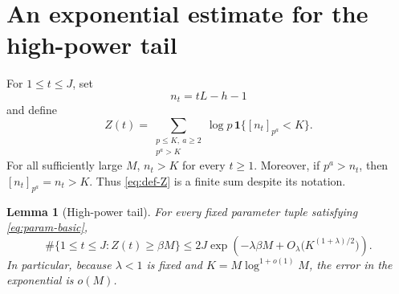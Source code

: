 \documentclass[11pt]{article}
\newtheorem{lemma}[theorem]{Lemma}
\theoremstyle{remark}
\newcommand{\ind}{\mathbf 1}
\begin{document}
\section{An exponential estimate for the high-power tail}\label{sec:tail}

For \(1\leq t\leq J\), set
\begin{equation}\label{eq:def-nt}
 n_t=tL-h-1
\end{equation}
and define
\begin{equation}\label{eq:def-Z}
 Z(t)=
 \sum_{\substack{p\leq K,\ a\geq2\\p^a>K}}
 \log p\,\ind\{[n_t]_{p^a}<K\}.
\end{equation}
For all sufficiently large \(M\), \(n_t>K\) for every \(t\geq1\).
Moreover, if \(p^a>n_t\), then
\([n_t]_{p^a}=n_t>K\).  Thus \eqref{eq:def-Z} is a finite sum despite
its notation.

\begin{lemma}[High-power tail]\label{lem:tail}
For every fixed parameter tuple satisfying \eqref{eq:param-basic},
\begin{equation}\label{eq:tail-bound}
 \#\{1\leq t\leq J:Z(t)\geq\beta M\}
 \leq
 2J\exp\!\left(-\lambda\beta M
       +O_\lambda\bigl(K^{(1+\lambda)/2}\bigr)\right).
\end{equation}
In particular, because \(\lambda<1\) is fixed and
\(K=M\log^{1+o(1)}M\), the error in the exponential is \(o(M)\).
\end{lemma}
\end{document}
